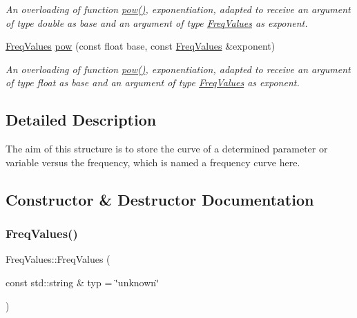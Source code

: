\begin{DoxyCompactItemize}
\begin{DoxyCompactList}\small\item\em An overloading of function {\ttfamily \hyperlink{structFreqValues_a337378f9483d9399a5872d3b16ad497e}{pow()}}, exponentiation, adapted to receive an argument of type {\itshape double} as base and an argument of type {\itshape \hyperlink{structFreqValues}{Freq\+Values}} as exponent. \end{DoxyCompactList}\item 
\mbox{\label{structFreqValues_a4a50ddd9aa3d48c0b3da456ca07551a5}} 
\hyperlink{structFreqValues}{Freq\+Values} \hyperlink{structFreqValues_a4a50ddd9aa3d48c0b3da456ca07551a5}{pow} (const float base, const \hyperlink{structFreqValues}{Freq\+Values} \&exponent)
\begin{DoxyCompactList}\small\item\em An overloading of function {\ttfamily \hyperlink{structFreqValues_a337378f9483d9399a5872d3b16ad497e}{pow()}}, exponentiation, adapted to receive an argument of type {\itshape float} as base and an argument of type {\itshape \hyperlink{structFreqValues}{Freq\+Values}} as exponent. \end{DoxyCompactList}\end{DoxyCompactItemize}


\subsection{Detailed Description}
The aim of this structure is to store the curve of a determined parameter or variable versus the frequency, which is named a frequency curve here. 

\subsection{Constructor \& Destructor Documentation}
\mbox{\label{structFreqValues_ab2ff89efb4571a8f6748017c6191d81e}} 
\subsubsection{\texorpdfstring{Freq\+Values()}{FreqValues()}\hspace{0.1cm}{\footnotesize\ttfamily [1/2]}}
{\footnotesize\ttfamily Freq\+Values\+::\+Freq\+Values (\begin{DoxyParamCaption}\item[{const std\+::string \&}]{typ = {\ttfamily \char`\"{}unknown\char`\"{}} }\end{DoxyParamCaption})\hspace{0.3cm}{\ttfamily [inline]}}



